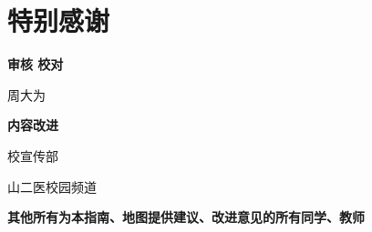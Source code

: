 \chapter*{特别感谢}
\noindent\begin{table*}[h]
    \centering
    \vspace{7em}

    {
        \large
        \textbf{审核 校对}
    }

    \vspace{.8em}
    周大为

    \vspace{3em}

    {
        \large
        \textbf{内容改进}
    }
    \vspace{.8em}

    校宣传部

    山二医校园频道

    \vspace{10em}
    {
        \large
        \textbf{其他所有为本指南、地图提供建议、改进意见的所有同学、教师}
    }

\end{table*}